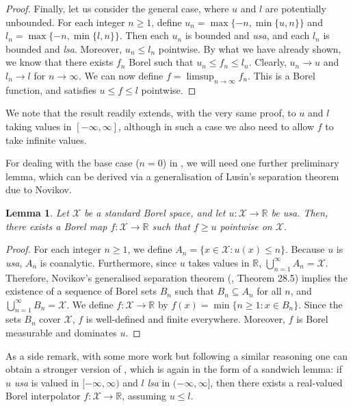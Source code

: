 \documentclass[10pt, a4paper]{article}
\newcommand{\lsa}{\emph{lsa}\xspace}
\newcommand{\R}{\mathbb R}
\newcommand{\usa}{\emph{usa}\xspace}
\newcommand{\X}{\mathcal X}
\newtheorem{lemma}{Lemma}
\begin{document}
\begin{proof}
Finally, let us consider the general case, where $u$ and $l$ are potentially unbounded.  For each integer $n\geq 1$, define $u_n = \max\{-n, \min\{u,n\}\}$ and $l_n = \max\{-n, \min\{l,n\}\}$. Then each $u_n$ is bounded and \usa, and each $l_n$ is bounded and \lsa. Moreover, $u_n\leq l_n$ pointwise. By what we have already shown, we know that there exists $f_n$ Borel such that $u_n\leq f_n\leq l_n$. Clearly, $u_n\to u$ and $l_n\to l$ for $n\to\infty$. We can now define $f = \limsup_{n\to\infty} f_n$. This is a Borel function, and satisfies  $u\leq f\leq l$ pointwise.
\end{proof}
We note that the result readily extends, with the very same proof, to $u$ and $l$ taking values in $[-\infty, \infty]$, although in such a case we also need to allow $f$ to take infinite values.

For dealing with the base case ($n=0$) in , we will  need one further preliminary lemma, which can be derived via a generalisation of Lusin's separation theorem due to Novikov.
\begin{lemma}\label{lemma:novikov}
Let $\X$ be a standard Borel space, and let $u:\X\to\R$ be \usa. Then, there exists a Borel map $f:\X\to\R$ such that $f\geq u$ pointwise on $\X$.
\end{lemma}
\begin{proof}
For each integer $n \geq 1$, we define $A_n = \{x \in \X : u(x) \leq n\}$. Because $u$ is \usa,  $A_n$ is  coanalytic. Furthermore, since $u$ takes values in $\R$, $\bigcup_{n=1}^\infty A_n = \X$. Therefore, Novikov's generalised separation theorem (\cite{kechris1995classical}, Theorem 28.5) implies the existence of a sequence of Borel sets $B_n$ such that $B_n \subseteq A_n$ for all $n$, and $\bigcup_{n=1}^\infty B_n = \X$. We  define $f: \X \to \R$ by $f(x) = \min \{n \geq 1 : x \in B_n\}$.
Since the sets $B_n$ cover $\X$, $f$ is well-defined and finite everywhere. Moreover, $f$ is  Borel measurable and dominates $u$.
\end{proof}

As a side remark, with some more work but following a similar reasoning one can obtain a stronger version of , which is again in the form of a sandwich lemma: if $u$ \usa is valued in $[-\infty, \infty)$ and $l$ \lsa in $(-\infty, \infty]$, then there exists a real-valued Borel interpolator $f: \X \to \R$, assuming $u \leq l$. 
\end{document}

